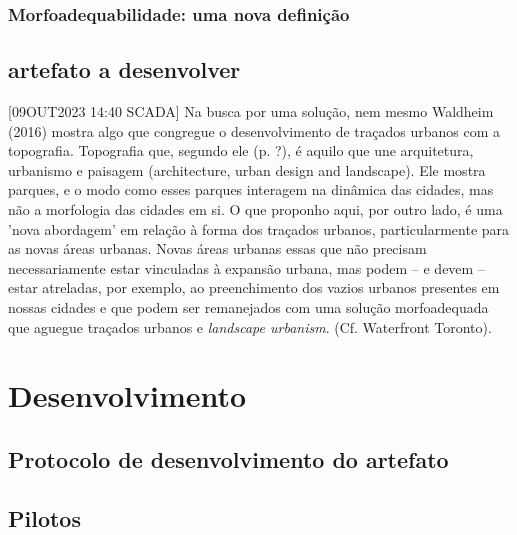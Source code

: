 \documentclass[12pt, a4paper]{book} %
\begin{document}
            \section{Morfoadequabilidade: uma nova definição} %

        












        \chapter[A escolha de uma solução]{artefato a desenvolver}

        [09OUT2023 14:40 SCADA] Na busca por uma solução, nem mesmo Waldheim (2016) mostra algo que congregue o desenvolvimento de traçados urbanos com a topografia. Topografia que, segundo ele (p. ?), é aquilo que une arquitetura, urbanismo e paisagem (architecture, urban design and landscape). Ele mostra parques, e o modo como esses parques interagem na dinâmica das cidades, mas não a morfologia das cidades em si.
        O que proponho aqui, por outro lado, é uma 'nova abordagem' em relação à forma dos traçados urbanos, particularmente para as novas áreas urbanas. Novas áreas urbanas essas que não precisam necessariamente estar vinculadas à expansão urbana, mas podem – e devem – estar atreladas, por exemplo, ao preenchimento dos vazios urbanos presentes em nossas cidades e que podem ser remanejados com uma solução morfoadequada que aguegue traçados urbanos e \textit{landscape urbanism}. (Cf. Waterfront Toronto).

    \part[Desenvolvimento]{Desenvolvimento}

        \chapter[Protocolo]{Protocolo de desenvolvimento do artefato}

        \chapter[O projeto de traçados hipotéticos]{Pilotos}
            
\end{document}
